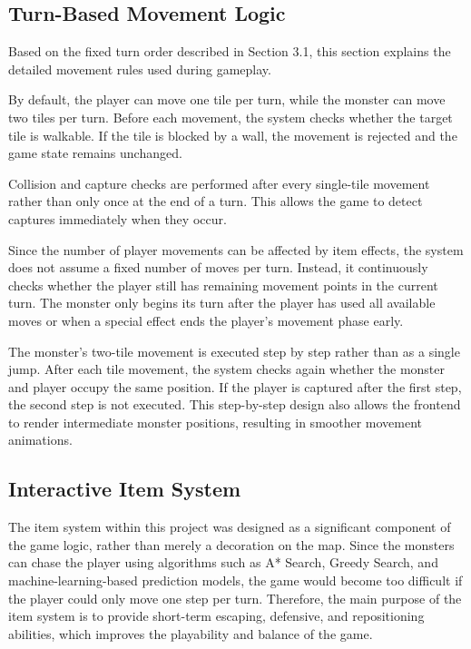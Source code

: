 \subsection{Turn-Based Movement Logic}

Based on the fixed turn order described in Section 3.1, this section explains the detailed movement rules used during gameplay.

By default, the player can move one tile per turn, while the monster can move two tiles per turn. Before each movement, the system checks whether the target tile is walkable. If the tile is blocked by a wall, the movement is rejected and the game state remains unchanged.

Collision and capture checks are performed after every single-tile movement rather than only once at the end of a turn. This allows the game to detect captures immediately when they occur.

Since the number of player movements can be affected by item effects, the system does not assume a fixed number of moves per turn. Instead, it continuously checks whether the player still has remaining movement points in the current turn. The monster only begins its turn after the player has used all available moves or when a special effect ends the player's movement phase early.

The monster's two-tile movement is executed step by step rather than as a single jump. After each tile movement, the system checks again whether the monster and player occupy the same position. If the player is captured after the first step, the second step is not executed. This step-by-step design also allows the frontend to render intermediate monster positions, resulting in smoother movement animations.


\subsection{Interactive Item System}

The item system within this project was designed as a significant component of the game logic, rather than merely a decoration on the map. Since the monsters can chase the player using algorithms such as A* Search, Greedy Search, and machine-learning-based prediction models, the game would become too difficult if the player could only move one step per turn. Therefore, the main purpose of the item system is to provide short-term escaping, defensive, and repositioning abilities, which improves the playability and balance of the game.

